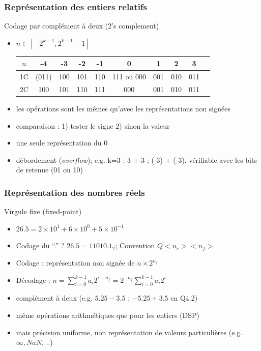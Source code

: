 \documentclass{beamer}
\begin{document}
\begin{frame}
\frametitle{Représentation des entiers relatifs}
\begin{block}{Codage par complément à deux (2's complement)}
\begin{itemize}
\item $n \in [-2^{k-1}, 2^{k-1}-1]$
  \begin{center}
\begin{tabular}{c|c|c|c|c|c|c|c|c|c}
$n$ & -4 & -3 & -2& -1 & 0 & 1 & 2 & 3 \\
\hline
1C & (011) & 100 & 101 & 110 & 111 ou 000 & 001 & 010 & 011\\
\hline
2C & 100 & 101 & 110 & 111 & 000 & 001 & 010 & 011
\end{tabular}
\end{center}
\item les opérations sont les mêmes qu'avec les représentations non signées
\item comparaison : 1) tester le signe 2) sinon la valeur
\item une seule représentation du 0
\item débordement (\emph{overflow}); e.g. k=3 :  3 + 3 ; (-3) + (-3), vérifiable avec les bits de retenue (01 ou 10)
\end{itemize}
\end{block}
\end{frame}

\begin{frame}
\frametitle{Représentation des nombres réels}
\begin{block}{Virgule fixe (fixed-point)}
\begin{itemize}
\item $26.5 = 2 \times 10^1 + 6 \times 10^0 + 5 \times 10^{-1}$
\item Codage du ``.'' ? $26.5 = 11010.1_2$; Convention $Q<n_e><n_f>$
\item Codage : représentation non signée de $n \times 2^{n_f}$
\item Décodage : $n = \sum_{i=0}^{k-1} a_i 2^{i - n_f} = 2^{-n_f} \sum_{i=0}^{k-1} a_i 2^i$
\item complément à deux (e.g. $5.25 - 3.5$ ; $-5.25 + 3.5$ en Q4.2)
\item même opérations arithmétiques que pour les entiers (DSP)
\item mais précision uniforme, non représentation de valeurs particulières (e.g. $\infty, NaN$, ..)
\end{itemize}
\end{block}
\end{frame}
\end{document}
